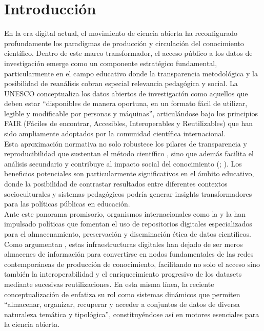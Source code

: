 \documentclass[runningheads]{llncs}
\begin{document}
\section{Introducción}
\label{intro}
En la era digital actual, el movimiento de ciencia abierta ha reconfigurado profundamente los paradigmas de producción y circulación del conocimiento científico. Dentro de este marco transformador, el acceso público a los datos de investigación emerge como un componente estratégico fundamental, particularmente en el campo educativo donde la transparencia metodológica y la posibilidad de reanálisis cobran especial relevancia pedagógica y social. La UNESCO \cite[p.~10]{unesco2021} conceptualiza los datos abiertos de investigación como aquellos que deben estar ``disponibles de manera oportuna, en un formato fácil de utilizar, legible y modificable por personas y máquinas'', articulándose bajo los principios FAIR (Fáciles de encontrar, Accesibles, Interoperables y Reutilizables) que han sido ampliamente adoptados por la comunidad científica internacional.\\

Esta aproximación normativa no solo robustece los pilares de transparencia y reproducibilidad que sustentan el método científico \cite{oecd2020}, sino que además facilita el análisis secundario y contribuye al impacto social del conocimiento (\cite{ec2016}; \cite{wilkinson2016}). Los beneficios potenciales son particularmente significativos en el ámbito educativo, donde la posibilidad de contrastar resultados entre diferentes contextos socioculturales y sistemas pedagógicos podría generar insights transformadores para las políticas públicas en educación.\\

Ante este panorama promisorio, organismos internacionales como la \cite{unesco2021} y la \cite{oecd2020} han impulsado políticas que fomentan el uso de repositorios digitales especializados para el almacenamiento, preservación y diseminación ética de datos científicos. Como argumentan \cite{borgman2018}, estas infraestructuras digitales han dejado de ser meros almacenes de información para convertirse en nodos fundamentales de las redes contemporáneas de producción de conocimiento, facilitando no solo el acceso sino también la interoperabilidad y el enriquecimiento progresivo de los datasets mediante sucesivas reutilizaciones. En esta misma línea, la reciente conceptualización de \cite[p.~27]{avila2024} enfatiza su rol como sistemas dinámicos que permiten ``almacenar, organizar, recuperar y acceder a conjuntos de datos de diversa naturaleza temática y tipológica'', constituyéndose así en motores esenciales para la ciencia abierta.\\
\end{document}
